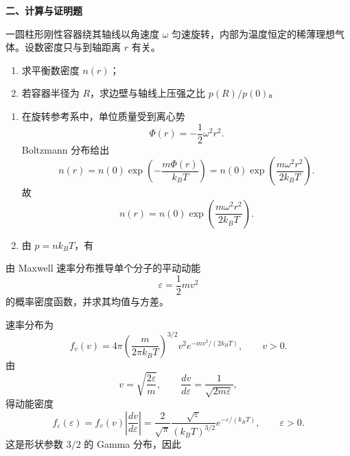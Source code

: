 \textbf{二、计算与证明题}
\begin{question}
一圆柱形刚性容器绕其轴线以角速度 $\omega$ 匀速旋转，内部为温度恒定的稀薄理想气体。设数密度只与到轴距离 $r$ 有关。
\begin{enumerate}[label=（\arabic*）,leftmargin=2.8em,itemsep=0.2em]
\item 求平衡数密度 $n(r)$；
\item 若容器半径为 $R$，求边壁与轴线上压强之比 $p(R)/p(0)$。
\end{enumerate}
\begin{solution}

\begin{enumerate}[label=（\arabic*）,leftmargin=2.8em,itemsep=0.2em]
\item 在旋转参考系中，单位质量受到离心势
\[
\Phi(r)=-\frac12\omega^2r^2.
\]
Boltzmann 分布给出
\[
n(r)=n(0)\exp\left(-\frac{m\Phi(r)}{k_BT}\right)
=n(0)\exp\left(\frac{m\omega^2r^2}{2k_BT}\right).
\]
故
\[
n(r)=n(0)\exp\left(\frac{m\omega^2r^2}{2k_BT}\right).
\]

\item 由 $p=nk_BT$，有
\end{enumerate}
\end{solution}
\end{question}

\begin{question}
由 Maxwell 速率分布推导单个分子的平动动能
\[
\varepsilon=\frac12 mv^2
\]
的概率密度函数，并求其均值与方差。
\begin{solution}

速率分布为
\[
f_v(v)=4\pi\left(\frac{m}{2\pi k_BT}\right)^{3/2}v^2e^{-mv^2/(2k_BT)},
\qquad v>0.
\]
由
\[
v=\sqrt{\frac{2\varepsilon}{m}},
\qquad \frac{dv}{d\varepsilon}=\frac{1}{\sqrt{2m\varepsilon}},
\]
得动能密度
\[
f_{\varepsilon}(\varepsilon)=f_v(v)\left|\frac{dv}{d\varepsilon}\right|
=\boxed{\frac{2}{\sqrt\pi}\frac{\sqrt\varepsilon}{(k_BT)^{3/2}}e^{-\varepsilon/(k_BT)}},
\qquad \varepsilon>0.
\]
这是形状参数 $3/2$ 的 Gamma 分布，因此
\end{solution}
\end{question}

